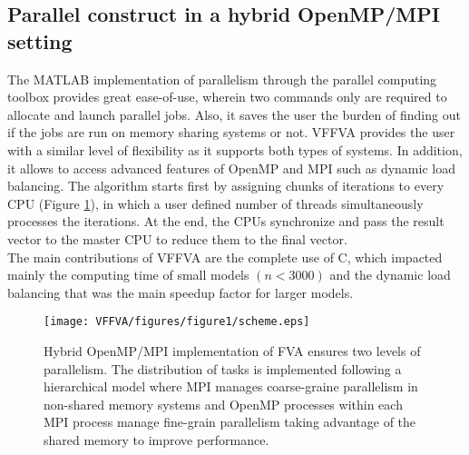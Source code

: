 \subsection*{Parallel construct in a hybrid OpenMP/MPI setting} 
The MATLAB implementation of parallelism through the parallel computing toolbox provides great ease-of-use, wherein two commands only are required to allocate and launch parallel jobs. Also, it saves the user the burden of finding out if the jobs are run on memory sharing systems or not. VFFVA provides the user with a similar level of flexibility as it supports both types of systems. In addition, it allows to access advanced features of OpenMP and MPI such as dynamic load balancing. The algorithm starts first by assigning chunks of iterations to every CPU (Figure \ref{fig:hybrid.}), in which a user defined number of threads simultaneously processes the iterations. At the end, the CPUs synchronize and pass the result vector to the master CPU to reduce them to the final vector. \\
The main contributions of VFFVA are the complete use of C, which impacted mainly the computing time of small models $(n<3000)$ and the dynamic load balancing that was the main speedup factor for larger models.
\begin{figure}[!htp]
\centering
\texttt{[image: VFFVA/figures/figure1/scheme.eps]}
\caption[Hybrid OpenMP/MPI implementation of FVA.]{Hybrid OpenMP/MPI implementation of FVA ensures two levels of parallelism. The distribution of tasks is implemented following a hierarchical model where MPI manages coarse-graine parallelism in non-shared memory systems and OpenMP processes within each MPI process manage fine-grain parallelism taking advantage of the shared memory to improve performance.}
\label{fig:hybrid.}
\end{figure}
